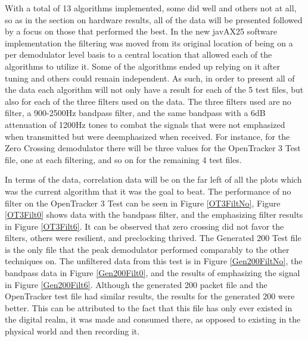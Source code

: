 With a total of 13 algorithms implemented, some did well and others not at all, so as in the section on hardware results, all of the data will be presented followed by a focus on those that performed the best. In the new javAX25 software implementation the filtering was moved from its original location of being on a per demodulator level basis to a central location that allowed each of the algorithms to utilize it. Some of the algorithms ended up relying on it after tuning and others could remain independent. As such, in order to present all of the data each algorithm will not only have a result for each of the 5 test files, but also for each of the three filters used on the data. The three filters used are no filter, a 900-2500Hz bandpass filter, and the same bandpass with a 6dB attenuation of 1200Hz tones to combat the signals that were not emphasized when transmitted but were deemphasized when received. For instance, for the Zero Crossing demodulator there will be three values for the OpenTracker 3 Test file, one at each filtering, and so on for the remaining 4 test files.

In terms of the data, correlation data will be on the far left of all the plots which was the current algorithm that it was the goal to beat. The performance of no filter on the OpenTracker 3 Test can be seen in Figure \ref{OT3FiltNo}, Figure \ref{OT3Filt0} shows data with the bandpass filter, and the emphasizing filter results in Figure \ref{OT3Filt6}. It can be observed that zero crossing did not favor the filters, others were resilient, and preclocking thrived. The Generated 200 Test file is the only file that the peak demodulator performed comparably to the other techniques on. The unfiltered data from this test is in Figure \ref{Gen200FiltNo}, the bandpass data in Figure \ref{Gen200Filt0}, and the results of emphasizing the signal in Figure \ref{Gen200Filt6}. Although the generated 200 packet file and the OpenTracker test file had similar results, the results for the generated 200 were better. This can be attributed to the fact that this file has only ever existed in the digital realm, it was made and consumed there, as opposed to existing in the physical world and then recording it.

